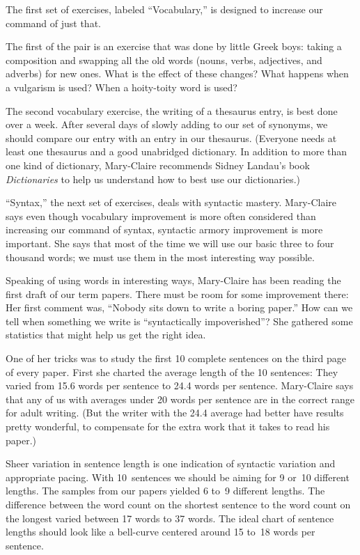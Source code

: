 The first set of exercises, labeled ``Vocabulary,'' is designed to increase
our command of just that.

The first of the pair is an exercise that was done by little Greek boys:
taking a composition and swapping all the old words (nouns, verbs,
adjectives, and adverbs) for new ones. What is the effect of these
changes?  What happens when a vulgarism is used?  When a hoity-toity word
is used?

The second vocabulary exercise, the writing of a thesaurus entry, is best
done over a week.  After several days of slowly adding to our set of
synonyms, we should compare our entry with an entry in our thesaurus.
(Everyone needs at least one thesaurus and a good unabridged dictionary.
In addition to more than one kind of dictionary, Mary-Claire recommends
Sidney Landau's book {\sl Dictionaries\/} to help us understand how to best use
our dictionaries.)

``Syntax,'' the next set of exercises, deals with syntactic mastery.
Mary-Claire says even though vocabulary improvement is more often
considered than increasing our command of syntax, syntactic armory
improvement is more important.  She says that most of the time we will use
our basic three to four thousand words; we must use them in the most
interesting way possible.

Speaking of using words in interesting ways, Mary-Claire has been reading
the first draft of our term papers. There must be room for some
improvement there:  Her first comment  was, ``Nobody sits down to
write a boring paper.''  How can we tell when something we write is
``syntactically impoverished''?  She gathered  some statistics that might
help us get the right idea.

One of her tricks was to study
 the first 10 complete sentences on the third page of every paper.
First she charted the
average length of the 10 sentences: They varied from 15.6 words per
sentence to 24.4 words per sentence.  Mary-Claire says that any of us with
averages under 20 words per sentence are in the correct range for adult
writing. (But the writer with the 24.4 average had better have
results pretty wonderful, to compensate for the
extra work that it takes to read his
paper.)

Sheer variation in sentence length is one indication of syntactic
variation and appropriate pacing. With 10~sentences we should be aiming
for 9 or~10 different lengths.  The samples from our papers yielded 6 to~9
different lengths.  The difference between the word count on the shortest
sentence to the word count on the longest varied between 17 words to 37
words.  The ideal chart of sentence lengths should look like a bell-curve
centered around 15 to~18 words per sentence.   

